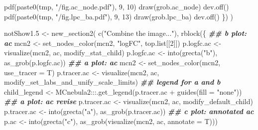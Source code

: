 \documentclass[
]{article}
\newenvironment{Shaded}{\begin{snugshade}}{\end{snugshade}}
\newcommand{\AttributeTok}[1]{\textcolor[rgb]{0.77,0.63,0.00}{#1}}
\newcommand{\DecValTok}[1]{\textcolor[rgb]{0.00,0.00,0.81}{#1}}
\newcommand{\DocumentationTok}[1]{\textcolor[rgb]{0.56,0.35,0.01}{\textbf{\textit{#1}}}}
\newcommand{\FloatTok}[1]{\textcolor[rgb]{0.00,0.00,0.81}{#1}}
\newcommand{\FunctionTok}[1]{\textcolor[rgb]{0.00,0.00,0.00}{#1}}
\newcommand{\NormalTok}[1]{#1}
\newcommand{\OtherTok}[1]{\textcolor[rgb]{0.56,0.35,0.01}{#1}}
\newcommand{\SpecialCharTok}[1]{\textcolor[rgb]{0.00,0.00,0.00}{#1}}
\newcommand{\StringTok}[1]{\textcolor[rgb]{0.31,0.60,0.02}{#1}}
\begin{document}
\begin{Shaded}
\begin{Highlighting}[]
    \FunctionTok{pdf}\NormalTok{(}\FunctionTok{paste0}\NormalTok{(tmp, }\StringTok{"/fig.ac\_node.pdf"}\NormalTok{), }\DecValTok{9}\NormalTok{, }\DecValTok{10}\NormalTok{)}
    \FunctionTok{draw}\NormalTok{(grob.ac\_node)}
    \FunctionTok{dev.off}\NormalTok{()}
    \FunctionTok{pdf}\NormalTok{(}\FunctionTok{paste0}\NormalTok{(tmp, }\StringTok{"/fig.lpc\_ba.pdf"}\NormalTok{), }\DecValTok{9}\NormalTok{, }\DecValTok{13}\NormalTok{)}
    \FunctionTok{draw}\NormalTok{(grob.lpc\_ba)}
    \FunctionTok{dev.off}\NormalTok{()}
\NormalTok{  \})}
\NormalTok{)}

\NormalTok{notShow1}\FloatTok{.5} \OtherTok{\textless{}{-}} \FunctionTok{new\_section2}\NormalTok{(}
  \FunctionTok{c}\NormalTok{(}\StringTok{"Combine the image..."}\NormalTok{),}
  \FunctionTok{rblock}\NormalTok{(\{}
    \DocumentationTok{\#\# b plot: ac}
\NormalTok{    mcn2 }\OtherTok{\textless{}{-}} \FunctionTok{set\_nodes\_color}\NormalTok{(mcn2, }\StringTok{"logFC"}\NormalTok{, top.list[[}\DecValTok{2}\NormalTok{]])}
\NormalTok{    p.logfc.ac }\OtherTok{\textless{}{-}} \FunctionTok{visualize}\NormalTok{(mcn2, ac, modify\_stat\_child)}
\NormalTok{    p.logfc.ac }\OtherTok{\textless{}{-}} \FunctionTok{into}\NormalTok{(}\FunctionTok{grecta}\NormalTok{(}\StringTok{"b"}\NormalTok{), }\FunctionTok{as\_grob}\NormalTok{(p.logfc.ac))}
    \DocumentationTok{\#\# a plot: ac}
\NormalTok{    mcn2 }\OtherTok{\textless{}{-}} \FunctionTok{set\_nodes\_color}\NormalTok{(mcn2, }\AttributeTok{use\_tracer =}\NormalTok{ T)}
\NormalTok{    p.tracer.ac }\OtherTok{\textless{}{-}} \FunctionTok{visualize}\NormalTok{(mcn2, ac, modify\_set\_labs\_and\_unify\_scale\_limits)}
    \DocumentationTok{\#\# legend for a and b}
\NormalTok{    child\_legend }\OtherTok{\textless{}{-}}\NormalTok{ MCnebula2}\SpecialCharTok{:::}\FunctionTok{.get\_legend}\NormalTok{(p.tracer.ac }\SpecialCharTok{+} \FunctionTok{guides}\NormalTok{(}\AttributeTok{fill =} \StringTok{"none"}\NormalTok{))}
    \DocumentationTok{\#\# a plot: ac revise}
\NormalTok{    p.tracer.ac }\OtherTok{\textless{}{-}} \FunctionTok{visualize}\NormalTok{(mcn2, ac, modify\_default\_child)}
\NormalTok{    p.tracer.ac }\OtherTok{\textless{}{-}} \FunctionTok{into}\NormalTok{(}\FunctionTok{grecta}\NormalTok{(}\StringTok{"a"}\NormalTok{), }\FunctionTok{as\_grob}\NormalTok{(p.tracer.ac))}
    \DocumentationTok{\#\# c plot: annotated ac}
\NormalTok{    p.ac }\OtherTok{\textless{}{-}} \FunctionTok{into}\NormalTok{(}\FunctionTok{grecta}\NormalTok{(}\StringTok{"c"}\NormalTok{), }\FunctionTok{as\_grob}\NormalTok{(}\FunctionTok{visualize}\NormalTok{(mcn2, ac, }\AttributeTok{annotate =}\NormalTok{ T)))}

\end{Highlighting}
\end{Shaded}
\end{document}
